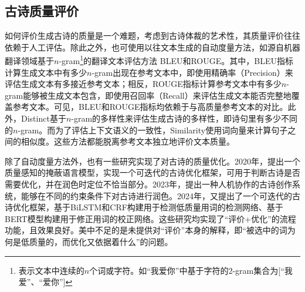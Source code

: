 \subsection{古诗质量评价}
如何评价生成古诗的质量是一个难题，考虑到古诗体裁的艺术性，其质量评价往往依赖于人工评估。除此之外，也可使用以往文本生成的自动度量方法，如源自机器翻译领域基于$n$-gram\footnote{表示文本中连续的$n$个词或字符。如“我爱你”中基于字符的$2$-gram集合为[“我爱”、“爱你”]}的翻译文本评估方法
BLEU\cite{papineniBLEUMethodAutomatic2002}和ROUGE\cite{linROUGEPackageAutomatic2004}。其中，BLEU指标计算生成文本中有多少$n$-gram出现在参考文本中，即使用精确率（Precision）来评估生成文本有多接近参考文本；相反，ROUGE指标计算参考文本中有多少$n$-gram能够被生成文本包含，即使用召回率（Recall）来评估生成文本能否完整地覆盖参考文本。可见，BLEU和ROUGE指标均依赖于与高质量参考文本的对比。此外，Distinct\cite{liDiversityPromotingObjectiveFunction2016}基于$n$-gram的多样性来评估生成古诗的多样性，即诗句里有多少不同的$n$-gram。而为了评估上下文语义的一致性，Similarity\cite{wietingUniversalParaphrasticSentence2016a}使用词向量来计算句子之间的相似度。这些方法都能脱离参考文本独立地评价文本质量。

除了自动度量方法外，也有一些研究实现了对古诗的质量优化。2020年，\cite{dengIterativePolishingFramework2020}提出一个质量感知的掩蔽语言模型，实现一个可迭代的古诗优化框架，可用于判断古诗是否需要优化，并在润色时定位不恰当部分。2023年，\cite{maYuShengHumaninLoop2023}提出一种人机协作的古诗创作系统，能够在不同的约束条件下对古诗进行润色。2024年，\cite{chenPolishingModelMachineGenerated2024}又提出了一个可迭代的古诗优化框架，基于BiLSTM和CRF构建用于检测低质量用词的检测网络、基于BERT模型构建用于修正用词的校正网络。这些研究均实现了“评价+优化”的流程功能，且效果良好。美中不足的是未提供对“评价”本身的解释，即“被选中的词为何是低质量的，而优化又依据着什么”的问题。

